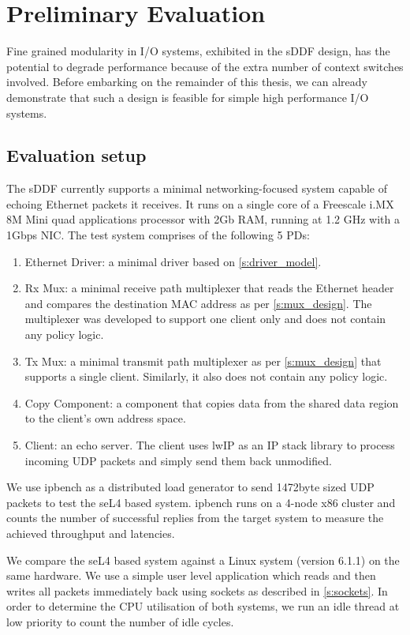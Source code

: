 \chapter{Preliminary Evaluation}\label{ch:prelim_eval}

Fine grained modularity in I/O systems, exhibited in the sDDF design, has the
potential to degrade performance because of the extra number of context switches involved.
Before embarking on the remainder of this thesis, we can already demonstrate that such a
design is feasible for simple high performance I/O systems.

\section{Evaluation setup}
The sDDF currently supports a minimal networking-focused system capable of echoing Ethernet packets it receives. It
runs on a single core of a Freescale i.MX 8M Mini quad applications processor with 2Gb RAM, running at 1.2 GHz with a 1Gbps NIC.
The test system comprises of the following 5 PDs:
\begin{enumerate}
\item Ethernet Driver: a minimal driver based on \ref{s:driver_model}.
\item Rx Mux: a minimal receive path multiplexer that reads the Ethernet header and compares the
destination MAC address as per \ref{s:mux_design}.
The multiplexer was developed to support one client only and does not contain any policy logic. 
\item Tx Mux: a minimal transmit path multiplexer as per \ref{s:mux_design} that supports a single
client. Similarly, it also does not contain any policy logic.
\item Copy Component: a component that copies data from the shared data region to the client's own address space. 
\item Client: an echo server. The client uses lwIP \cite{Dunkels_01} as an IP stack library to process incoming 
UDP packets and simply send them back unmodified. 
\end{enumerate}

We use ipbench \cite{Wienand_Macpherson_04} as a distributed load generator to send 1472byte sized UDP packets to test the seL4 based system. 
ipbench runs on a 4-node x86 cluster and counts the number of successful replies from the target system to measure the achieved throughput and latencies.

We compare the seL4 based system against a Linux system (version 6.1.1) on the same hardware. We use a simple user level application which 
reads and then writes all packets immediately back using sockets as described in \ref{s:sockets}. 
In order to determine the CPU utilisation of both systems, we run an idle thread at low priority to count the number of idle cycles. 

